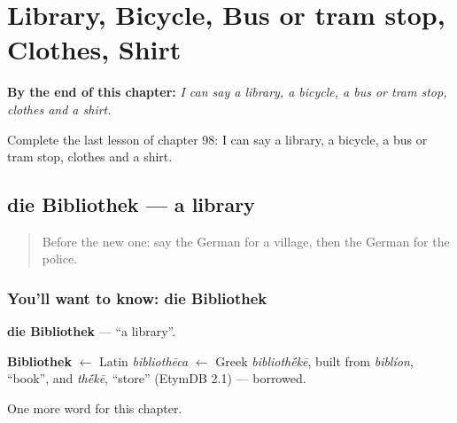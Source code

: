 
\chapter{Library, Bicycle, Bus or tram stop, Clothes, Shirt}
\label{ch:ge-library-bicycle-bus-or-tram-stop-clothes-shirt}

\begin{chapteropening}
\textbf{By the end of this chapter:} \emph{I can say a library, a bicycle, a bus or tram stop, clothes and a shirt.}

Complete the last lesson of chapter 98: I can say a library, a bicycle, a bus or tram stop, clothes and a shirt.
\end{chapteropening}

\section[die Bibliothek]{die Bibliothek — a library}

\label{lesson:GE-C98-bibliothek}



\begin{quote}
Before the new one: say the German for a village, then the German for the police.
\end{quote}

\subsection*{You'll want to know: die Bibliothek}
\textbf{die Bibliothek} — \textquotedblleft{}a library\textquotedblright{}.

\begin{cousinweb}
\textbf{Bibliothek} $\leftarrow$ Latin \emph{bibliothēca} $\leftarrow$ Greek \emph{biblioth\'{\={e}}kē}, built from \emph{biblíon}, \textquotedblleft{}book\textquotedblright{}, and \emph{th\'{\={e}}kē}, \textquotedblleft{}store\textquotedblright{} (EtymDB 2.1) — borrowed.
\end{cousinweb}

\begin{grammarlens}[title={What you've built}]
One more word for this chapter.
\end{grammarlens}


